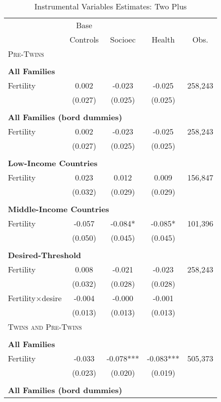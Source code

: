 \begin{table}[!htbp] \centering 
\caption{Instrumental Variables Estimates: Two Plus} 
\label{TWINtab:IVTwoplus} 
\begin{tabular}{lcccc} \toprule \toprule 
&Base&&&\\
&Controls&Socioec&Health&Obs.\\\midrule
\multicolumn{5}{l}{\textsc{Pre-Twins}}\\ 
&&&&\\
\multicolumn{5}{l}{\textbf{All Families}}\\ 
Fertility&0.002&-0.023&-0.025&258,243\\
         &(0.027)&(0.025)&(0.025)&\\
&&&&\\
\multicolumn{5}{l}{\textbf{All Families (bord dummies)}}\\ 
Fertility&0.002&-0.023&-0.025&258,243\\
         &(0.027)&(0.025)&(0.025)&\\
&&&&\\
\multicolumn{5}{l}{\textbf{Low-Income Countries}}\\ 
Fertility&0.023&0.012&0.009&156,847\\
         &(0.032)&(0.029)&(0.029)&\\
&&&&\\
\multicolumn{5}{l}{\textbf{Middle-Income Countries}}\\ 
Fertility&-0.057&-0.084*&-0.085*&101,396\\
         &(0.050)&(0.045)&(0.045)&\\
&&&&\\
\multicolumn{5}{l}{\textbf{Desired-Threshold}}\\ 
Fertility&0.008&-0.021&-0.023&258,243\\
         &(0.032)&(0.028)&(0.028)&\\
Fertility$\times$desire&-0.004&-0.000&-0.001&\\
         &(0.013)&(0.013)&(0.013)&\\
\midrule\multicolumn{5}{l}{\textsc{Twins and Pre-Twins}}\\ 
&&&&\\
\multicolumn{5}{l}{\textbf{All Families}}\\ 
Fertility&-0.033&-0.078***&-0.083***&505,373\\
         &(0.023)&(0.020)&(0.019)&\\
&&&&\\
\multicolumn{5}{l}{\textbf{All Families (bord dummies)}}\\ 

\end{tabular}
\end{table}
